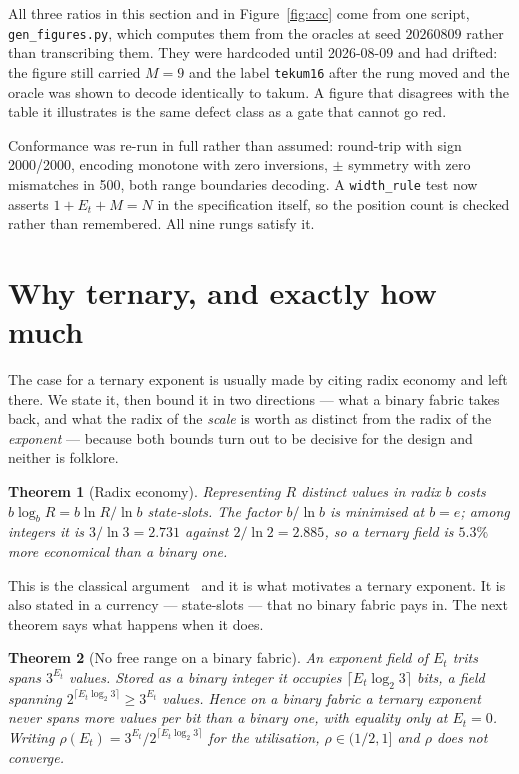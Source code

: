 \documentclass[11pt]{article}
\newtheorem{theorem}{Theorem}
\theoremstyle{definition}
\begin{document}
All three ratios in this section and in Figure~\ref{fig:acc} come from one
script, \texttt{gen\_figures.py}, which computes them from the oracles at seed
$20260809$ rather than transcribing them. They were hardcoded until 2026-08-09 and
had drifted: the figure still carried $M = 9$ and the label \texttt{tekum16} after
the rung moved and the oracle was shown to decode identically to takum. A figure
that disagrees with the table it illustrates is the same defect class as a gate
that cannot go red.

Conformance was re-run in full rather than assumed: round-trip with sign
2000/2000, encoding monotone with zero inversions, $\pm$ symmetry with zero
mismatches in 500, both range boundaries decoding. A \texttt{width\_rule} test now
asserts $1 + E_t + M = N$ in the specification itself, so the position count is
checked rather than remembered. All nine rungs satisfy it.

\section{Why ternary, and exactly how much}\label{sec:whyternary}

The case for a ternary exponent is usually made by citing radix economy and left
there. We state it, then bound it in two directions --- what a binary fabric takes
back, and what the radix of the \emph{scale} is worth as distinct from the radix
of the \emph{exponent} --- because both bounds turn out to be decisive for the
design and neither is folklore.

\begin{theorem}[Radix economy]
\label{thm:economy}
Representing $R$ distinct values in radix $b$ costs $b\log_b R = b\ln R/\ln b$
state-slots. The factor $b/\ln b$ is minimised at $b = e$; among integers it is
$3/\ln 3 = 2.731$ against $2/\ln 2 = 2.885$, so a ternary field is $5.3\%$ more
economical than a binary one.
\end{theorem}

This is the classical argument~\cite{hayes2001,radixeconomy} and it is what
motivates a ternary exponent. It is also stated in a currency --- state-slots ---
that no binary fabric pays in. The next theorem says what happens when it does.

\begin{theorem}[No free range on a binary fabric]
\label{thm:nofree}
An exponent field of $E_t$ trits spans $3^{E_t}$ values. Stored as a binary
integer it occupies $\lceil E_t\log_2 3\rceil$ bits, a field spanning
$2^{\lceil E_t\log_2 3\rceil} \geq 3^{E_t}$ values. Hence on a binary fabric a
ternary exponent never spans more values per bit than a binary one, with equality
only at $E_t = 0$. Writing $\rho(E_t) = 3^{E_t}/2^{\lceil E_t\log_2 3\rceil}$ for
the utilisation, $\rho \in (1/2, 1]$ and $\rho$ does not converge.
\end{theorem}
\end{document}
